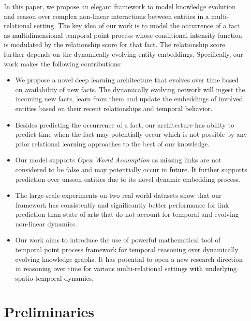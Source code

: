 \documentclass{article}
\begin{document}
In this paper, we propose an elegant framework to model knowledge evolution and reason over complex non-linear interactions between entities in a multi-relational setting. The key idea of our work is to model the occurrence of a fact as multidimensional temporal point process whose conditional intensity function is modulated by the relationship score for that fact. The relationship score further depends on the dynamically evolving entity embeddings. Specifically, our work makes the following contributions:
\begin{itemize}[leftmargin=*,nosep]
\item We propose a novel deep learning architecture that evolves over time based on availability of new facts. The dynamically evolving network will ingest the incoming new facts, learn from them and update the embeddings of involved entities based on their recent relationships and temporal behavior.

\item Besides predicting the occurrence of a fact, our architecture has ability to predict time when the fact may potentially occur which is not possible by any prior relational learning approaches to the best of our knowledge. 

\item Our model supports \textit{Open World Assumption} as missing links are not considered to be false and may potentially occur in future. It further supports prediction over unseen entities due to its novel dynamic embedding process.
 
\item The large-scale experiments on two real world datasets show that our framework has consistently and significantly better performance for link prediction than state-of-arts that do not account for temporal and evolving non-linear dynamics.

\item Our work aims to introduce the use of powerful mathematical tool of temporal point process framework for temporal reasoning over dynamically evolving knowledge graphs. It has potential to open a new research direction in reasoning over time for various multi-relational settings with underlying spatio-temporal dynamics.
\end{itemize}

\vspace{-0.3cm}
\section{Preliminaries}
\end{document}
